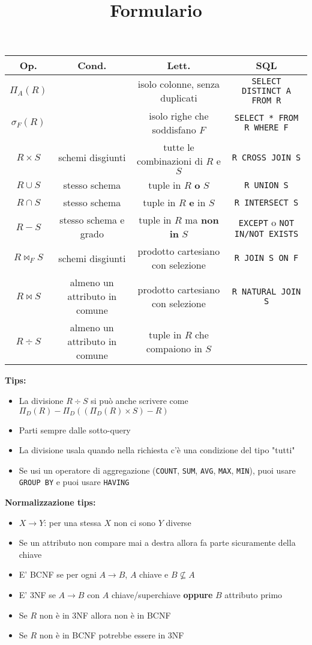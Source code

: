 \documentclass[10pt]{article}
\title{Formulario}
\date{}
\begin{document}
\maketitle
\begin{table}[h]
    \centering
    \begin{tabular}{|c|c|c|c|}
        \hline
        \textbf{Op.} & \textbf{Cond.} & \textbf{Lett.} & \textbf{SQL}\\
        \hline
        $\Pi_{A}(R)$ &  & isolo colonne, senza duplicati & \texttt{SELECT DISTINCT A FROM R}\\
        $\sigma_{F}(R)$ &  & isolo righe che soddisfano $F$ & \texttt{SELECT * FROM R WHERE F}\\
        $R \times S$ & schemi disgiunti & tutte le combinazioni di $R$ e $S$ & \texttt{R CROSS JOIN S}\\
        $R \cup S$ & stesso schema & tuple in $R$ \textbf{o} $S$ & \texttt{R UNION S}\\
        $R \cap S$ & stesso schema & tuple in $R$ \textbf{e} in $S$ & \texttt{R INTERSECT S}\\
        $R - S$ & stesso schema e grado & tuple in $R$ ma \textbf{non in} $S$ & \texttt{EXCEPT} o \texttt{NOT IN/NOT EXISTS}\\
        $R \bowtie_{F} S$ & schemi disgiunti & prodotto cartesiano con selezione & \texttt{R JOIN S ON F}\\
        $R \bowtie S$ & almeno un attributo in comune & prodotto cartesiano con selezione & \texttt{R NATURAL JOIN S}\\
        $R \div S$ & almeno un attributo in comune & tuple in $R$ che compaiono in $S$ & \\
        \hline
    \end{tabular}
\end{table}
\textbf{Tips:}
\begin{itemize}
    \item La divisione $R \div S$ si può anche scrivere come $\Pi_{D}(R) - \Pi_{D}((\Pi_{D}(R)\times S)-R)$
    \item Parti sempre dalle sotto-query
    \item La divisione usala quando nella richiesta c'è una condizione del tipo "tutti"
    \item Se usi un operatore di aggregazione (\texttt{COUNT}, \texttt{SUM}, \texttt{AVG}, \texttt{MAX}, \texttt{MIN}), puoi usare \texttt{GROUP BY} e puoi usare \texttt{HAVING}
\end{itemize}
\textbf{Normalizzazione tips:}
\begin{itemize}
    \item $X \rightarrow Y$: per una stessa $X$ non ci sono $Y$ diverse
    \item Se un attributo non compare mai a destra allora fa parte sicuramente della chiave
    \item E' BCNF se per ogni $A\rightarrow B$, $A$ chiave e $B \nsubseteq A$
    \item E' 3NF se $A\rightarrow B$ con $A$ chiave/superchiave \textbf{oppure} $B$ attributo primo
    \item Se $R$ non è in 3NF allora non è in BCNF
    \item Se $R$ non è in BCNF potrebbe essere in 3NF
\end{itemize}
\end{document}
